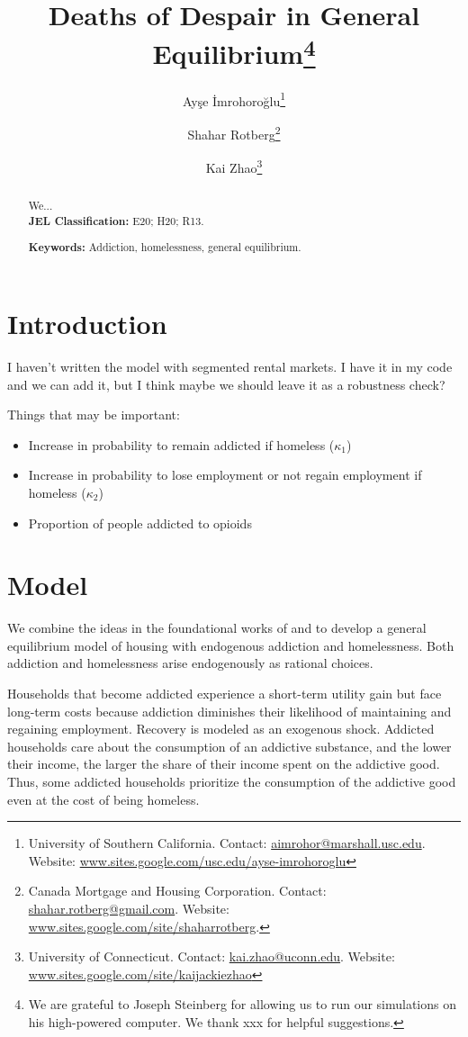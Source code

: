\documentclass[parskip=full]{article}
\title{\vspace{-1.8cm}Deaths of Despair in General Equilibrium\footnote{We are grateful to Joseph Steinberg for allowing us to run our simulations on his high-powered computer. We thank xxx for helpful suggestions.}}
\author{Ayşe İmrohoroğlu\footnote{University of Southern California. Contact: \url{aimrohor@marshall.usc.edu}. Website: \url{www.sites.google.com/usc.edu/ayse-imrohoroglu}} \and Shahar Rotberg\footnote{Canada Mortgage and Housing Corporation. Contact: \url{shahar.rotberg@gmail.com}. Website: \url{www.sites.google.com/site/shaharrotberg}.} \and Kai Zhao\footnote{University of Connecticut. Contact: \url{kai.zhao@uconn.edu}. Website: \url{www.sites.google.com/site/kaijackiezhao}}}
\begin{document}
\maketitle

\begin{abstract}
\onehalfspacing
\noindent

\noindent We...
\\[1.5ex]

\noindent \textbf{JEL Classification:} E20; H20; R13. 

\noindent \textbf{Keywords:} Addiction, homelessness, general equilibrium.
\end{abstract}

\section{Introduction}

I haven't written the model with segmented rental markets. I have it in my code and we can add it, but I think maybe we should leave it as a robustness check?

Things that may be important:
\begin{itemize}
    \item Increase in probability to remain addicted if homeless ($\kappa_{1}$)
    \item Increase in probability to lose employment or not regain employment if homeless ($\kappa_{2}$)
    \item Proportion of people addicted to opioids
\end{itemize}


\section{Model}\label{sec:model}

We combine the ideas in the foundational works of \citet{becker-murphy-1988} and \citet{az-2024} to develop a general equilibrium model of housing with endogenous addiction and homelessness. Both addiction and homelessness arise endogenously as rational choices. 

Households that become addicted experience a short-term utility gain but face long-term costs because addiction diminishes their likelihood of maintaining and regaining employment. Recovery is modeled as an exogenous shock. Addicted households care about the consumption of an addictive substance, and the lower their income, the larger the share of their income spent on the addictive good. Thus, some addicted households prioritize the consumption of the addictive good even at the cost of being homeless. 
\end{document}
